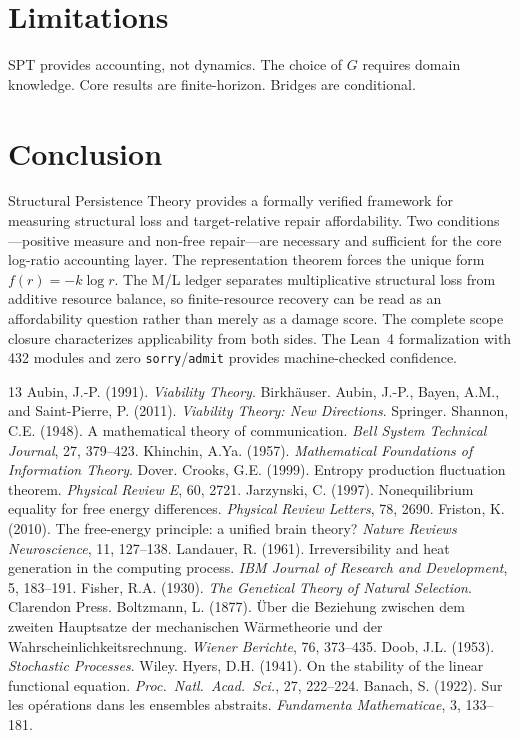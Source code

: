 \documentclass[11pt,a4paper]{article}
\begin{document}
\section{Limitations}

SPT provides accounting, not dynamics. The choice of $G$ requires domain knowledge. Core results are finite-horizon. Bridges are conditional.

\section{Conclusion}

Structural Persistence Theory provides a formally verified framework for measuring structural loss and target-relative repair affordability. Two conditions---positive measure and non-free repair---are necessary and sufficient for the core log-ratio accounting layer. The representation theorem forces the unique form $f(r)=-k\log r$. The M/L ledger separates multiplicative structural loss from additive resource balance, so finite-resource recovery can be read as an affordability question rather than merely as a damage score. The complete scope closure characterizes applicability from both sides. The Lean~4 formalization with 432 modules and zero \texttt{sorry}/\texttt{admit} provides machine-checked confidence.

\begin{thebibliography}{13}
 Aubin, J.-P. (1991). \emph{Viability Theory}. Birkh\"auser.
 Aubin, J.-P., Bayen, A.M., and Saint-Pierre, P. (2011). \emph{Viability Theory: New Directions}. Springer.
 Shannon, C.E. (1948). A mathematical theory of communication. \emph{Bell System Technical Journal}, 27, 379--423.
 Khinchin, A.Ya. (1957). \emph{Mathematical Foundations of Information Theory}. Dover.
 Crooks, G.E. (1999). Entropy production fluctuation theorem. \emph{Physical Review E}, 60, 2721.
 Jarzynski, C. (1997). Nonequilibrium equality for free energy differences. \emph{Physical Review Letters}, 78, 2690.
 Friston, K. (2010). The free-energy principle: a unified brain theory? \emph{Nature Reviews Neuroscience}, 11, 127--138.
 Landauer, R. (1961). Irreversibility and heat generation in the computing process. \emph{IBM Journal of Research and Development}, 5, 183--191.
 Fisher, R.A. (1930). \emph{The Genetical Theory of Natural Selection}. Clarendon Press.
 Boltzmann, L. (1877). \"Uber die Beziehung zwischen dem zweiten Hauptsatze der mechanischen W\"armetheorie und der Wahrscheinlichkeitsrechnung. \emph{Wiener Berichte}, 76, 373--435.
 Doob, J.L. (1953). \emph{Stochastic Processes}. Wiley.
 Hyers, D.H. (1941). On the stability of the linear functional equation. \emph{Proc.\ Natl.\ Acad.\ Sci.}, 27, 222--224.
 Banach, S. (1922). Sur les op\'erations dans les ensembles abstraits. \emph{Fundamenta Mathematicae}, 3, 133--181.
\end{thebibliography}
\end{document}
